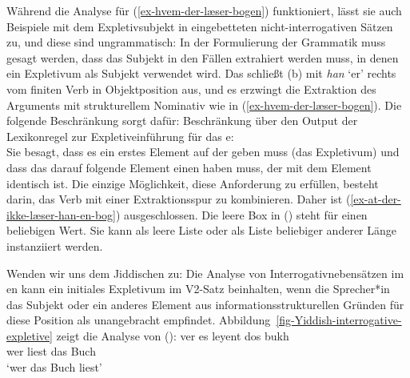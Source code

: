Während die Analyse für (\ref{ex-hvem-der-læser-bogen}) funktioniert, lässt sie auch Beispiele mit dem
Expletivsubjekt in eingebetteten nicht-interrogativen Sätzen zu, und diese sind ungrammatisch:
\eal
{}
\zl
In der Formulierung der Grammatik muss gesagt werden, dass das Subjekt in den
Fällen extrahiert werden muss, in denen ein Expletivum als Subjekt verwendet wird. Das schließt (b) mit \emph{han}
`er' rechts vom finiten Verb in Objektposition aus, und es erzwingt die Extraktion des
Arguments mit strukturellem Nominativ wie in (\ref{ex-hvem-der-læser-bogen}). Die folgende
Beschränkung sorgt dafür:
\ea
Beschränkung über den Output der Lexikonregel zur Expletiveinführung für das e:\\
\z
Sie besagt, dass es ein erstes Element auf der \argstl geben muss (das Expletivum) und dass das darauf
folgende Element einen \slashw haben muss, der mit dem Element identisch ist. Die einzige Möglichkeit, diese
Anforderung zu erfüllen, besteht darin, das Verb mit einer Extraktionsspur zu kombinieren. Daher
ist (\ref{ex-at-der-ikke-læser-han-en-bog}) ausgeschlossen. Die leere Box in () steht für einen beliebigen Wert. Sie kann
als leere Liste oder als Liste beliebiger anderer Länge instanziiert werden.

Wenden wir uns dem Jiddischen zu: Die Analyse von Interrogativnebensätzen im en kann ein initiales Expletivum im V2-Satz
beinhalten, wenn die Sprecher*in das Subjekt oder ein anderes Element aus informationsstrukturellen Gründen für
diese Position als unangebracht empfindet. Abbildung~\ref{fig-Yiddish-interrogative-expletive} zeigt die Analyse von ():
\ea
\gll ver es leyent dos bukh\\
     wer \expl{} liest das Buch\\\yiddish
\glt `wer das Buch liest'
\z

